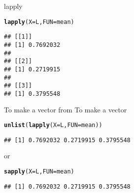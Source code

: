 \documentclass[aspectratio=169]{beamer}\usepackage[]{graphicx}\usepackage[]{xcolor}
\makeatletter
\newcommand{\hldef}[1]{\textcolor[rgb]{0.345,0.345,0.345}{#1}}%
\newcommand{\hlkwc}[1]{\textcolor[rgb]{0.333,0.667,0.333}{#1}}%
\newcommand{\hlkwd}[1]{\textcolor[rgb]{0.737,0.353,0.396}{\textbf{#1}}}%
\newenvironment{kframe}{%
 \def\at@end@of@kframe{}%
 \ifinner\ifhmode%
  \def\at@end@of@kframe{\end{minipage}}%
  \begin{minipage}{\columnwidth}%
 \fi\fi%
 \def\FrameCommand##1{\hskip\@totalleftmargin \hskip-\fboxsep
 \colorbox{shadecolor}{##1}\hskip-\fboxsep
     \hskip-\linewidth \hskip-\@totalleftmargin \hskip\columnwidth}%
 \MakeFramed {\advance\hsize-\width
   \@totalleftmargin\z@ \linewidth\hsize
   \@setminipage}}%
 {\par\unskip\endMakeFramed%
 \at@end@of@kframe}
\newenvironment{knitrout}{}{} %
\makeatother
\begin{document}
\begin{frame}[fragile]{lapply}
\begin{knitrout}
\color{fgcolor}\begin{kframe}
\begin{alltt}
\hlkwd{lapply}\hldef{(}\hlkwc{X} \hldef{= L,} \hlkwc{FUN} \hldef{= mean)}
\end{alltt}
\begin{verbatim}
## [[1]]
## [1] 0.7692032
## 
## [[2]]
## [1] 0.2719915
## 
## [[3]]
## [1] 0.3795548
\end{verbatim}
\end{kframe}
\end{knitrout}
\end{frame}

\begin{frame}[fragile]{To make a vector from }
To make a vector
\begin{knitrout}
\color{fgcolor}\begin{kframe}
\begin{alltt}
\hlkwd{unlist}\hldef{(}\hlkwd{lapply}\hldef{(}\hlkwc{X} \hldef{= L,} \hlkwc{FUN} \hldef{= mean))}
\end{alltt}
\begin{verbatim}
## [1] 0.7692032 0.2719915 0.3795548
\end{verbatim}
\end{kframe}
\end{knitrout}
or
\begin{knitrout}
\color{fgcolor}\begin{kframe}
\begin{alltt}
\hlkwd{sapply}\hldef{(}\hlkwc{X} \hldef{= L,} \hlkwc{FUN} \hldef{= mean)}
\end{alltt}
\begin{verbatim}
## [1] 0.7692032 0.2719915 0.3795548
\end{verbatim}
\end{kframe}
\end{knitrout}
\end{frame} 
\end{document}
